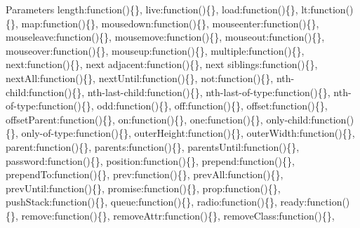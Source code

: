 \begin{DoxyParams}{Parameters}
\textquotesingle{}length\textquotesingle{}\+:function()\{\}, \textquotesingle{}live\textquotesingle{}\+:function()\{\}, \textquotesingle{}load\textquotesingle{}\+:function()\{\}, \textquotesingle{}lt\textquotesingle{}\+:function()\{\}, \textquotesingle{}map\textquotesingle{}\+:function()\{\}, \textquotesingle{}mousedown\textquotesingle{}\+:function()\{\}, \textquotesingle{}mouseenter\textquotesingle{}\+:function()\{\}, \textquotesingle{}mouseleave\textquotesingle{}\+:function()\{\}, \textquotesingle{}mousemove\textquotesingle{}\+:function()\{\}, \textquotesingle{}mouseout\textquotesingle{}\+:function()\{\}, \textquotesingle{}mouseover\textquotesingle{}\+:function()\{\}, \textquotesingle{}mouseup\textquotesingle{}\+:function()\{\}, \textquotesingle{}multiple\textquotesingle{}\+:function()\{\}, \textquotesingle{}next\textquotesingle{}\+:function()\{\}, \textquotesingle{}next adjacent\textquotesingle{}\+:function()\{\}, \textquotesingle{}next siblings\textquotesingle{}\+:function()\{\}, \textquotesingle{}next\+All\textquotesingle{}\+:function()\{\}, \textquotesingle{}next\+Until\textquotesingle{}\+:function()\{\}, \textquotesingle{}not\textquotesingle{}\+:function()\{\}, \textquotesingle{}nth-\/child\textquotesingle{}\+:function()\{\}, \textquotesingle{}nth-\/last-\/child\textquotesingle{}\+:function()\{\}, \textquotesingle{}nth-\/last-\/of-\/type\textquotesingle{}\+:function()\{\}, \textquotesingle{}nth-\/of-\/type\textquotesingle{}\+:function()\{\}, \textquotesingle{}odd\textquotesingle{}\+:function()\{\}, \textquotesingle{}off\textquotesingle{}\+:function()\{\}, \textquotesingle{}offset\textquotesingle{}\+:function()\{\}, \textquotesingle{}offset\+Parent\textquotesingle{}\+:function()\{\}, \textquotesingle{}on\textquotesingle{}\+:function()\{\}, \textquotesingle{}one\textquotesingle{}\+:function()\{\}, \textquotesingle{}only-\/child\textquotesingle{}\+:function()\{\}, \textquotesingle{}only-\/of-\/type\textquotesingle{}\+:function()\{\}, \textquotesingle{}outer\+Height\textquotesingle{}\+:function()\{\}, \textquotesingle{}outer\+Width\textquotesingle{}\+:function()\{\}, \textquotesingle{}parent\textquotesingle{}\+:function()\{\}, \textquotesingle{}parents\textquotesingle{}\+:function()\{\}, \textquotesingle{}parents\+Until\textquotesingle{}\+:function()\{\}, \textquotesingle{}password\textquotesingle{}\+:function()\{\}, \textquotesingle{}position\textquotesingle{}\+:function()\{\}, \textquotesingle{}prepend\textquotesingle{}\+:function()\{\}, \textquotesingle{}prepend\+To\textquotesingle{}\+:function()\{\}, \textquotesingle{}prev\textquotesingle{}\+:function()\{\}, \textquotesingle{}prev\+All\textquotesingle{}\+:function()\{\}, \textquotesingle{}prev\+Until\textquotesingle{}\+:function()\{\}, \textquotesingle{}promise\textquotesingle{}\+:function()\{\}, \textquotesingle{}prop\textquotesingle{}\+:function()\{\}, \textquotesingle{}push\+Stack\textquotesingle{}\+:function()\{\}, \textquotesingle{}queue\textquotesingle{}\+:function()\{\}, \textquotesingle{}radio\textquotesingle{}\+:function()\{\}, \textquotesingle{}ready\textquotesingle{}\+:function()\{\}, \textquotesingle{}remove\textquotesingle{}\+:function()\{\}, \textquotesingle{}remove\+Attr\textquotesingle{}\+:function()\{\}, \textquotesingle{}remove\+Class\textquotesingle{}\+:function()\{\}, 
\end{DoxyParams}
